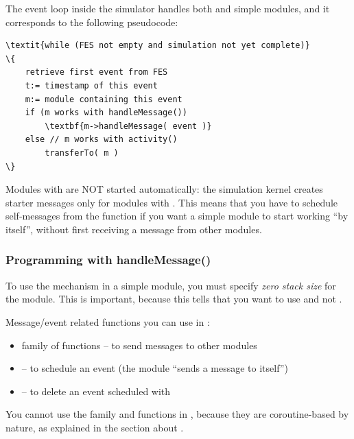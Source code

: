 The event loop inside the simulator handles both 
and  simple modules, and it corresponds
to the following pseudocode:

\begin{Verbatim}[commandchars=\\\{\}]
\textit{while (FES not empty and simulation not yet complete)}
\{
    retrieve first event from FES
    t:= timestamp of this event
    m:= module containing this event
    if (m works with handleMessage())
        \textbf{m->handleMessage( event )}
    else // m works with activity()
        transferTo( m )
\}
\end{Verbatim}

Modules with  are NOT started automatically:
the simulation kernel creates starter messages
only for modules with . This means that you have to
schedule self-messages from the
 function if you want a 
simple module to start working ``by itself'', without first receiving
a message from other modules.


\subsubsection{Programming with handleMessage()}


To use the  mechanism in a
simple module, you must specify \textit{zero
  stack size} for the module. This is
important, because this tells {\opp} that you want to use
 and not .

Message/event related functions you can use in :

\begin{itemize}
  \item{ family of functions -- to send messages to other modules}
  \item{ -- to schedule an event (the module ``sends a message to itself'')}
  \item{ -- to delete an event scheduled with }
\end{itemize}

You cannot use the  family and
 functions in , because they are
coroutine-based by nature, as explained in the section about
.

